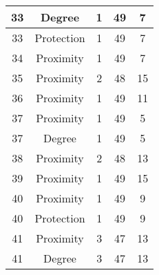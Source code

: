 \documentclass[results.tex]{subfiles}
\begin{document}
\begin{center}
\begin{tabular}{| c || c | c | c | c |}
            \hline
            33                      & Degree                       & 1                      & 49                      & 7                    \\
            \hline
            33                      & Protection                   & 1                      & 49                      & 7                    \\
            \hline
            34                      & Proximity                    & 1                      & 49                      & 7                    \\
            \hline
            35                      & Proximity                    & 2                      & 48                      & 15                   \\
            \hline
            36                      & Proximity                    & 1                      & 49                      & 11                   \\
            \hline
            37                      & Proximity                    & 1                      & 49                      & 5                    \\
            \hline
            37                      & Degree                       & 1                      & 49                      & 5                    \\
            \hline
            38                      & Proximity                    & 2                      & 48                      & 13                   \\
            \hline
            39                      & Proximity                    & 1                      & 49                      & 15                   \\
            \hline
            40                      & Proximity                    & 1                      & 49                      & 9                    \\
            \hline
            40                      & Protection                   & 1                      & 49                      & 9                    \\
            \hline
            41                      & Proximity                    & 3                      & 47                      & 13                   \\
            \hline
            41                      & Degree                       & 3                      & 47                      & 13                   \\

\end{tabular}
\end{center}
\end{document}
